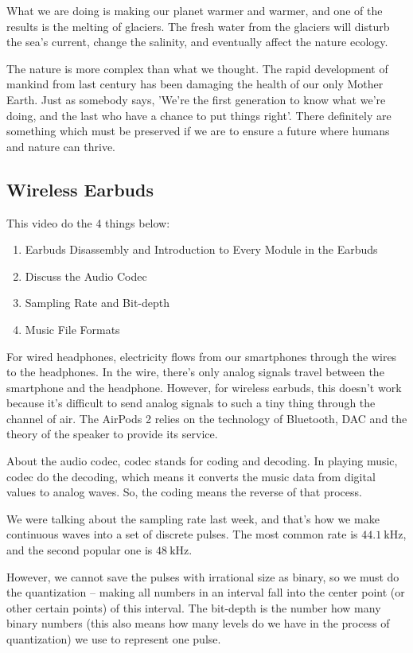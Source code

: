 \documentclass{article}
\begin{document}
What we are doing is making our planet warmer and warmer, and one of the results is the melting of glaciers. The fresh water from the glaciers will disturb the sea's current, change the salinity, and eventually affect the nature ecology.

The nature is more complex than what we thought. The rapid development of mankind from last century has been damaging the health of our only Mother Earth. Just as somebody says, 'We're the first generation to know what we're doing, and the last who have a chance to put things right'. There definitely are something which must be preserved if we are to ensure a future where humans and nature can thrive.

\subsection{Wireless Earbuds}

This video do the 4 things below:

\begin{enumerate}
    \item 
    Earbuds Disassembly and Introduction to Every Module in the Earbuds
    \item 
    Discuss the Audio Codec
    \item 
    Sampling Rate and Bit-depth
    \item 
    Music File Formats
\end{enumerate}

For wired headphones, electricity flows from our smartphones through the wires to the headphones. In the wire, there's only analog signals travel between the smartphone and the headphone. However, for wireless earbuds, this doesn't work because it's difficult to send analog signals to such a tiny thing through the channel of air. The AirPods 2 relies on the technology of Bluetooth, DAC and the theory of the speaker to provide its service. 

About the audio codec, codec stands for coding and decoding. In playing music, codec do the decoding, which means it converts the music data from digital values to analog waves. So, the coding means the reverse of that process.

We were talking about the sampling rate last week, and that's how we make continuous waves into a set of discrete pulses. The most common rate is $44.1~\mathrm{kHz}$, and the second popular one is $48~\mathrm{kHz}$.

However, we cannot save the pulses with irrational size as binary, so we must do the quantization -- making all numbers in an interval fall into the center point (or other certain points) of this interval. The bit-depth is the number how many binary numbers (this also means how many levels do we have in the process of quantization) we use to represent one pulse.
\end{document}
